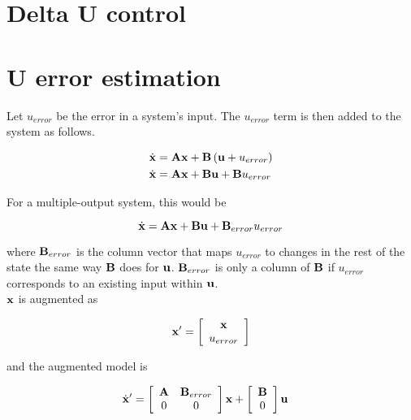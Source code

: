 \section{Delta U control}

\section{U error estimation}

Let $u_{error}$ be the error in a system's input. The $u_{error}$ term is then
added to the system as follows.

\begin{align*}
  \dot{\mathbf{x}} &= \mathbf{A}\mathbf{x} + \mathbf{B}\left(\mathbf{u} + u_{error}\right) \\
  \dot{\mathbf{x}} &= \mathbf{A}\mathbf{x} + \mathbf{B}\mathbf{u} + \mathbf{B}u_{error}
\end{align*}

\noindent For a multiple-output system, this would be

\begin{equation*}
  \dot{\mathbf{x}} = \mathbf{A}\mathbf{x} + \mathbf{B}\mathbf{u} + \mathbf{B}_{error}u_{error}
\end{equation*}

\noindent where $\mathbf{B}_{error}$ is the column vector that maps $u_{error}$ to
changes in the rest of the state the same way $\mathbf{B}$ does for $\mathbf{u}$.
$\mathbf{B}_{error}$ is only a column of $\mathbf{B}$ if $u_{error}$ corresponds to an
existing input within $\mathbf{u}$. \\

$\mathbf{x}$ is augmented as

\begin{equation*}
  \mathbf{x'} = \left[
  \begin{array}{c}
    \mathbf{x} \\
    u_{error}
  \end{array}
  \right]
\end{equation*}

\noindent and the augmented model is

\begin{align*}
  \dot{\mathbf{x}}' &= \left[
  \begin{array}{cc}
    \mathbf{A} & \mathbf{B}_{error} \\
    0 & 0
  \end{array}
  \right] \mathbf{x} + \left[
  \begin{array}{c}
    \mathbf{B} \\
    0
  \end{array}
  \right] \mathbf{u}
\end{align*}

